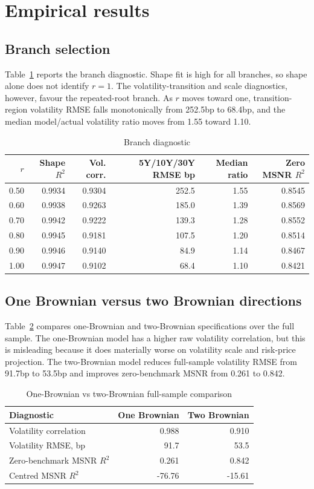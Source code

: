\documentclass[11pt]{article}
\numberwithin{equation}{section}
\begin{document}
\section{Empirical results}
\subsection{Branch selection}
Table~\ref{tab:branch} reports the branch diagnostic. Shape fit is high for all branches, so shape alone does not identify $r=1$. The volatility-transition and scale diagnostics, however, favour the repeated-root branch. As $r$ moves toward one, transition-region volatility RMSE falls monotonically from 252.5bp to 68.4bp, and the median model/actual volatility ratio moves from 1.55 toward 1.10.

\begin{table}[htbp]\centering\caption{Branch diagnostic}\label{tab:branch}\begin{tabular}{rrrrrr}\toprule
$r$ & Shape $R^2$ & Vol. corr. & 5Y/10Y/30Y RMSE bp & Median ratio & Zero MSNR $R^2$\\\midrule
0.50&0.9934&0.9304&252.5&1.55&0.8545\\
0.60&0.9938&0.9263&185.0&1.39&0.8569\\
0.70&0.9942&0.9222&139.3&1.28&0.8552\\
0.80&0.9945&0.9181&107.5&1.20&0.8514\\
0.90&0.9946&0.9140&84.9&1.14&0.8467\\
1.00&0.9947&0.9102&68.4&1.10&0.8421\\\bottomrule\end{tabular}\end{table}

\subsection{One Brownian versus two Brownian directions}
Table~\ref{tab:brownianfull} compares one-Brownian and two-Brownian specifications over the full sample. The one-Brownian model has a higher raw volatility correlation, but this is misleading because it does materially worse on volatility scale and risk-price projection. The two-Brownian model reduces full-sample volatility RMSE from 91.7bp to 53.5bp and improves zero-benchmark MSNR from 0.261 to 0.842.

\begin{table}[htbp]\centering\caption{One-Brownian vs two-Brownian full-sample comparison}\label{tab:brownianfull}\begin{tabular}{lrr}\toprule
Diagnostic&One Brownian&Two Brownian\\\midrule
Volatility correlation&0.988&0.910\\
Volatility RMSE, bp&91.7&53.5\\
Zero-benchmark MSNR $R^2$&0.261&0.842\\
Centred MSNR $R^2$&-76.76&-15.61\\\bottomrule\end{tabular}\end{table}
\end{document}
